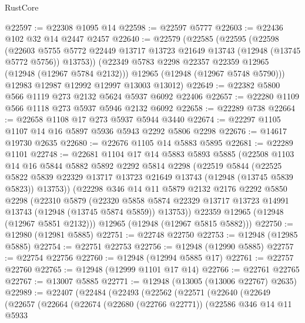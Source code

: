 \begin{lexlean}{RustCore}
\begin{coremodule}
@22597 := @22308 @1095 @14
@22598 := @22597 @5777
@22603 := @22436 @102 @32 @14 @2447 @2457
@22640 := @22579
    (@22585
      (@22595
        (@22598
          (@22603
            @5755
            @5772
            @22449
            @13717
            @13723
            @21649
            @13743
            (@12948 (@13745 @5772 @5756))
            @13753))
        (@22349 @5783 @2298 @22357 @22359 @12965 (@12948 (@12967 @5784 @2132)))
        @12965
        (@12948 (@12967 @5748 @5790)))
      @12983
      @12987
      @12992
      @12997
      @13003
      @13012)
@22649 := @22382 @5800 @566 @1119 @273 @2132 @5624 @5937 @6092 @22406
@22657 := @22280 @1109 @566 @1118 @273 @5937 @5946 @2132 @6092
@22658 := @22289 @738
@22664 := @22658 @1108 @17 @273 @5937 @5944 @3440
@22674 := @22297 @1105 @1107 @14 @16 @5897 @5936 @5943 @2292 @5806 @2298
@22676 := @14617 @19730 @2635
@22680 := @22676 @1105 @14 @5883 @5895
@22681 := @22289 @1101
@22748 := @22681
    @1104
    @17
    @14
    @5883
    @5893
    @5885
    (@22508
      @1103
      @14
      @16
      @5844
      @5882
      @5892
      @2292
      @5814
      @2298
      (@22519
        @5844
        (@22525
          @5822
          @5839
          @22329
          @13717
          @13723
          @21649
          @13743
          (@12948 (@13745 @5839 @5823))
          @13753))
      (@22298
        @346
        @14
        @11
        @5879
        @2132
        @2176
        @2292
        @5850
        @2298
        (@22310
          @5879
          (@22320
            @5858
            @5874
            @22329
            @13717
            @13723
            @14991
            @13743
            (@12948 (@13745 @5874 @5859))
            @13753))
        @22359
        @12965
        (@12948 (@12967 @5851 @2132)))
      @12965
      (@12948 (@12967 @5815 @5882)))
@22750 := @12980 (@12981 @5885)
@22751 := @22748 @22750
@22753 := @12948 (@12985 @5885)
@22754 := @22751 @22753
@22756 := @12948 (@12990 @5885)
@22757 := @22754 @22756
@22760 := @12948 (@12994 @5885 @17)
@22761 := @22757 @22760
@22765 := @12948 (@12999 @1101 @17 @14)
@22766 := @22761 @22765
@22767 := @13007 @5885
@22771 := @12948 (@13005 (@13006 @22767) @2635)
@22989 := @22407
    (@22484
      (@22493
        (@22562
          (@22571
            (@22640
              (@22649
                (@22657
                  (@22664
                    (@22674
                      (@22680 (@22766 @22771))
                      (@22586
                        @346
                        @14
                        @11
                        @5933

\end{coremodule}
\end{lexlean}
